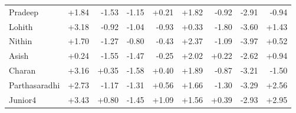 \begin{table}[htbp]
\begin{tabular}{lrrrrrrrr}
    Pradeep & +1.84 & -1.53 & -1.15 & +0.21 & +1.82 & -0.92 & -2.91 & -0.94 \\
    Lohith & +3.18 & -0.92 & -1.04 & -0.93 & +0.33 & -1.80 & -3.60 & +1.43 \\
    Nithin & +1.70 & -1.27 & -0.80 & -0.43 & +2.37 & -1.09 & -3.97 & +0.52 \\
    Asish & +0.24 & -1.55 & -1.47 & -0.25 & +2.02 & +0.22 & -2.62 & +0.94 \\
    Charan & +3.16 & +0.35 & -1.58 & +0.40 & +1.89 & -0.87 & -3.21 & -1.50 \\
    Parthasaradhi & +2.73 & -1.17 & -1.31 & +0.56 & +1.66 & -1.30 & -3.29 & +2.56 \\
    Junior4 & +3.43 & +0.80 & -1.45 & +1.09 & +1.56 & +0.39 & -2.93 & +2.95 \\
    \bottomrule
  \end{tabular}
\end{table}
